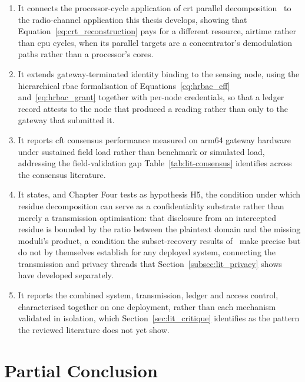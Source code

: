 \documentclass[12pt,a4paper,oneside]{book}
\begin{document}
\begin{enumerate}
  \item It connects the processor-cycle application of \gls{crt} parallel
        decomposition~\cite{beloa2025bitcoincrt} to the radio-channel
        application this thesis develops, showing that
        Equation~\ref{eq:crt_reconstruction} pays for a different resource,
        airtime rather than \gls{cpu} cycles, when its parallel targets are
        a concentrator's demodulation paths rather than a processor's
        cores.
  \item It extends gateway-terminated identity binding to the sensing
        node, using the hierarchical \gls{rbac} formalisation of
        Equations~\ref{eq:hrbac_eff} and~\ref{eq:hrbac_grant}
        \cite{beloasone2025hrbac} together with per-node credentials, so
        that a ledger record attests to the node that produced a reading
        rather than only to the gateway that submitted it.
  \item It reports \gls{cft} consensus performance measured on \gls{arm64}
        gateway hardware under sustained field load rather than benchmark
        or simulated load, addressing the field-validation gap
        Table~\ref{tab:lit-consensus} identifies across the consensus
        literature.
  \item It states, and Chapter Four tests as hypothesis H5, the condition
        under which residue decomposition can serve as a confidentiality
        substrate rather than merely a transmission optimisation: that
        disclosure from an intercepted residue is bounded by the ratio
        between the plaintext domain and the missing moduli's product, a
        condition the subset-recovery results
        of~\cite{goldreich1999china,shoup2009computational} make precise
        but do not by themselves establish for any deployed system,
        connecting the transmission and privacy threads that
        Section~\ref{subsec:lit_privacy} shows have developed
        separately.
  \item It reports the combined system, transmission, ledger and access
        control, characterised together on one deployment, rather than
        each mechanism validated in isolation, which
        Section~\ref{sec:lit_critique} identifies as the pattern the
        reviewed literature does not yet show.
\end{enumerate}

\section{Partial Conclusion}
\label{sec:lit_partial_conclusion}
\end{document}
